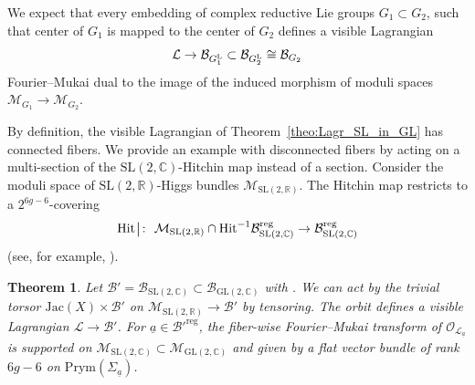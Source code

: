 \documentclass[10pt,a4paper]{amsart}
\numberwithin{equation}{section}
\newtheorem{theo}{Theorem}[section]
\theoremstyle{definition}
\newcommand{\reg}{\mathrm{reg}}
\newcommand{\Jac}{\mathrm{Jac}}
\newcommand{\rest}{\: \rule[-3.5pt]{0.5pt}{11.5pt}\,{}}
\renewcommand{\to}{\rightarrow}
\newcommand{\calB}{\mathcal{B}}
\newcommand{\calL}{\mathcal{L}}
\newcommand{\calM}{\mathcal{M}}
\newcommand{\calO}{\mathcal{O}}
\newcommand{\RR}{\mathbb{R}}
\newcommand{\CC}{\mathbb{C}}
\newcommand{\Prym}{\mathrm{Prym}}
\newcommand{\Hit}{\mathrm{Hit}}
\newcommand{\GL}{\mathrm{GL}}
\newcommand{\SL}{\mathrm{SL}}
\begin{document}
We expect that every embedding of complex reductive Lie groups $G_1 \subset G_2$, such that center of $G_1$ is mapped to the center of $G_2$ defines a visible Lagrangian
\[ \calL \to \calB_{G_1^{\rm L}}\subset \calB_{G_2^{\rm L}}\cong \calB_{G_2}
 \] Fourier--Mukai dual to the image of the induced morphism of moduli spaces $\calM_{G_1} \rightarrow \calM_{G_2}$.

By definition, the visible Lagrangian of Theorem~\ref{theo:Lagr_SL_in_GL} has connected fibers. We provide an example with disconnected fibers by acting on a multi-section of the $\SL(2,\CC)$-Hitchin map instead of a section. Consider the moduli space of $\SL(2,\RR)$-Higgs bundles $\calM_{\SL(2,\RR)}$. The Hitchin map restricts to a $2^{6g-6}$-covering
\[ \Hit\rest\colon \ \calM_{\SL(2,\RR)} \cap \Hit^{-1}\calB_{\SL(2,\CC)}^\reg \to \calB_{\SL(2,\CC)}^\reg
 \]
(see, for example, \cite[Corollary~9.3]{Horn1}).
\begin{theo}\label{theo:Lagr_SL_in_GL_multisection} Let $\calB'=\calB_{\SL(2,\CC)} \subset \calB_{\GL(2,\CC)}$ with \smash{$\calB'^\reg=\calB^{\reg}_{\SL(2,\CC)}$}. We can act by the trivial torsor $\Jac(X) \times \calB'$ on $\calM_{\SL(2,\RR)} \to \calB'$ by tensoring. The orbit defines a visible Lagrangian $\calL \to \calB'$. For $\underline{a} \in \calB'^\reg$, the fiber-wise Fourier--Mukai transform of $\calO_{\calL_{\underline{a}}}$ is supported on $\calM_{\SL(2,\CC)} \subset \calM_{\GL(2,\CC)}$ and given by a flat vector bundle of rank $6g-6$ on $\Prym(\Sigma_{\underline{a}})$.
\end{theo}
\end{document}
